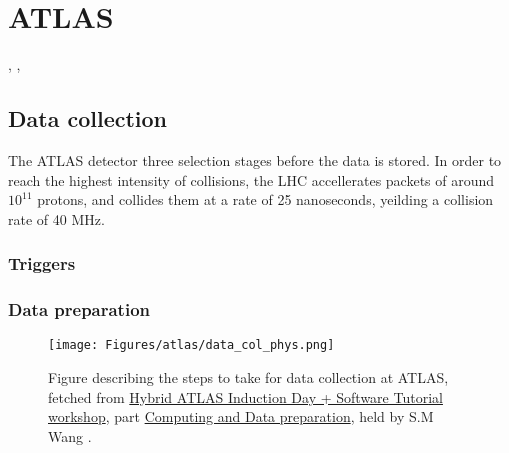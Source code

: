 \section*{ATLAS}

, \cite{collaboration_2020}, \cite{Owen:2302730} 






\subsection*{Data collection}
The ATLAS detector three selection stages before the data is stored. In order to reach the highest intensity of collisions, the LHC accellerates
packets of around $10^{11}$ protons, and collides them at a rate of 25 nanoseconds, yeilding a collision rate of 40 MHz\cite{Wang:2707056}. \cite{Bernius:2707054}

\subsubsection*{Triggers}


\subsubsection*{Data preparation}

\begin{figure}
    \texttt{[image: Figures/atlas/data\_col\_phys.png]}
    \caption{Figure describing the steps to take for data collection at ATLAS, fetched from \href{https://indico.cern.ch/event/1159574/timetable/?view=standard}{Hybrid ATLAS Induction Day + Software Tutorial workshop}, part
    \href{https://indico.cern.ch/event/860971/contributions/3672974/attachments/1972049/3280896/Atlas_computing_data_preparation_jan20.pdf}{Computing and Data preparation}, 
    held by S.M Wang \cite{Wang:2707056} . }
    \label{fig:atlas_data_col_phys}
\end{figure}

